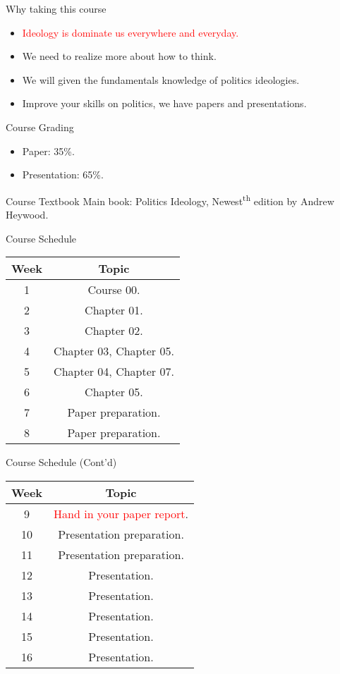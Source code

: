 \documentclass{beamer}
\begin{document}
\begin{frame}{Why taking this course}
\begin{itemize}
\pause
\item \textcolor{red}{Ideology is dominate us everywhere and everyday.}
\pause
\item We need to realize more about how to think.
\pause
\item We will given the fundamentals knowledge of politics ideologies.
\pause
\item Improve your skills on politics, we have papers and presentations.
\end{itemize}
\end{frame}
\begin{frame}{Course Grading}
\begin{itemize}
\pause
\item Paper: 35\%.
\vspace{1em}
\pause
\item Presentation: 65\%.
\end{itemize}
\end{frame}
\begin{frame}{Course Textbook}
\pause
Main book: Politics Ideology, Newest\textsuperscript{th} edition by Andrew Heywood. \\
\end{frame}
\begin{frame}{Course Schedule}
\begin{center}
\begin{tabular}{|c|c|}
\hline
Week & Topic \\
\hline
1 & Course 00.\\
\hline
2 & Chapter 01.\\
\hline
3 & Chapter 02.\\
\hline
4 & Chapter 03, Chapter 05.\\
\hline
5 & Chapter 04, Chapter 07.\\
\hline
6 & Chapter 05.\\
\hline
7 & Paper preparation.\\
\hline
8 & Paper preparation.\\
\hline
\end{tabular}
\end{center}
\end{frame}
\begin{frame}{Course Schedule (Cont'd)}
\begin{center}
\begin{tabular}{|c|c|}
\hline
Week & Topic \\
\hline
9 & \textcolor{red}{Hand in your paper report}.\\
\hline
10 & Presentation preparation.\\
\hline
11 & Presentation preparation.\\
\hline
12 & Presentation.\\
\hline
13 & Presentation.\\
\hline
14 & Presentation.\\
\hline
15 & Presentation.\\
\hline
16 & Presentation.\\
\hline
\end{tabular}
\end{center}
\end{frame}
\end{document}
